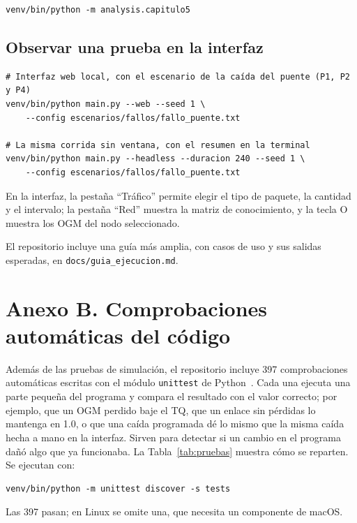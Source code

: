 \begin{verbatim}
venv/bin/python -m analysis.capitulo5
\end{verbatim}

\subsection*{Observar una prueba en la interfaz}

\begin{verbatim}
# Interfaz web local, con el escenario de la caída del puente (P1, P2 y P4)
venv/bin/python main.py --web --seed 1 \
    --config escenarios/fallos/fallo_puente.txt

# La misma corrida sin ventana, con el resumen en la terminal
venv/bin/python main.py --headless --duracion 240 --seed 1 \
    --config escenarios/fallos/fallo_puente.txt
\end{verbatim}

En la interfaz, la pestaña ``Tráfico'' permite elegir el tipo de paquete, la cantidad y el
intervalo; la pestaña ``Red'' muestra la matriz de conocimiento, y la tecla O muestra los OGM del
nodo seleccionado.

El repositorio incluye una guía más amplia, con casos de uso y sus salidas esperadas, en
\texttt{docs/guia\_ejecucion.md}.

\section*{Anexo B. Comprobaciones automáticas del código}

Además de las pruebas de simulación, el repositorio incluye 397 comprobaciones automáticas escritas
con el módulo \texttt{unittest} de Python~\cite{Python}. Cada una ejecuta una parte pequeña del
programa y compara el resultado con el valor correcto; por ejemplo, que un OGM perdido baje el TQ,
que un enlace sin pérdidas lo mantenga en 1.0, o que una caída programada dé lo mismo que la misma
caída hecha a mano en la interfaz. Sirven para detectar si un cambio en el programa dañó algo que
ya funcionaba. La Tabla~\ref{tab:pruebas} muestra cómo se reparten. Se ejecutan con:

\begin{verbatim}
venv/bin/python -m unittest discover -s tests
\end{verbatim}

Las 397 pasan; en Linux se omite una, que necesita un componente de macOS.

